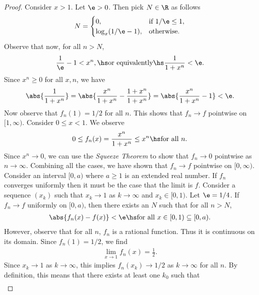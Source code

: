 \documentclass{article}
\begin{document}
\begin{proof}
   Consider $x>1$. Let $\e>0$. Then pick $N\in\R$ as follows
   \begin{align*}
      N = \begin{cases}
         0,              & \text{if }1/\e \leq 1, \\
         \log_x(1/\e-1), & \text{otherwise.}
      \end{cases}
   \end{align*}
   Observe that now, for all $n>N$,
   \begin{align*}
      \frac{1}{\e} - 1 < x^n,
      \hs\text{or equivalently}\hs
      \frac{1}{1+x^n}< \e.
   \end{align*}
   Since $x^n\geq 0$ for all $x,n$, we have
   \begin{align*}
      \abs{\frac{1}{1+x^n}}=\abs{\frac{x^n}{1+x^n}-\frac{1+x^n}{1+x^n}}
      =\abs{\frac{x^n}{1+x^n}-1}<\e.
   \end{align*}
   Now observe that $f_n(1)=1/2$ for all $n$.
   This shows that $f_n\to f$ pointwise on $[1,\infty)$. Consider $0\leq x<1$.
   We observe
   \begin{align*}
      0 \leq f_n(x)=\frac{x^n}{1 + x^n} \leq x^n\hs\text{for all }n.
   \end{align*}
   Since $x^n\to 0$, we can use the \emph{Squeeze Theorem} to show that
   $f_n\to 0$ pointwise as $n\to\infty$. Combining all the cases, we have shown that
   $f_n\to f$ pointwise on $[0, \infty)$. Consider an interval $[0,a)$ where $a\geq 1$
   is an extended real number. If $f_n$ converges uniformly then it must be the
   case that the limit is $f$. Consider a sequence $(x_k)$ such that $x_k\to 1$ as
   $k\to\infty$ and $x_k\in[0,1)$. Let $\e=1/4$. If $f_n\to f$ uniformly on $[0, a)$, then
   there exists an $N$ such that for all $n>N$,
   \begin{align}
      \label{cond1}
      \abs{f_n(x)-f(x)} < \e \hs\text{for all }x\in [0, 1) \subseteq [0, a).
   \end{align}
   However, observe that for all $n$, $f_n$ is a rational function. Thus it is
   continuous on its domain. Since $f_n(1)=1/2$, we find
   \begin{align*}
      \lim_{x\to 1} f_n(x) = \frac{1}{2}.
   \end{align*}
   Since $x_k\to 1$ as $k\to\infty$, this implies $f_n(x_k)\to 1/2$ as $k\to\infty$ for all $n$.
   By definition, this means that there exists at least one $k_0$ such that
   \begin{align}
      \label{cond2}

\end{align}
\end{proof}
\end{document}

